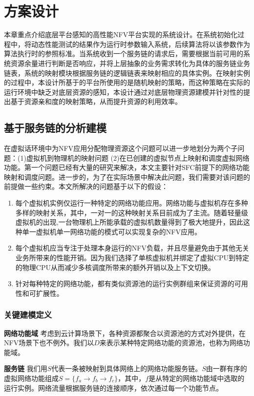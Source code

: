 \chapter{方案设计}
\label{chap:design}
本章重点介绍底层平台感知的高性能NFV平台实现的系统设计。在系统初始化过程中，将动态性能测试的结果作为运行时参数输入系统，后续算法将以该参数作为算法执行时的参照标准。当系统收到一个服务链的请求后，需要根据当前可用的系统资源余量进行判断是否响应，并将上层抽象的业务需求转化为具体的服务链业务链表，系统的映射模块根据服务链的逻辑链表来映射相应的具体实例。在映射实例的过程中，本设计所基于的平台所使用的是随机映射的策略，而这种策略在实际的运行环境中缺乏对底层资源的感知，本设计通过对底层物理资源建模并针对性的提出基于资源亲和度的映射策略，从而提升资源的利用效率。

\section{基于服务链的分析建模}
在虚拟话环境中为NFV应用分配物理资源这个问题可以进一步地划分为两个子问题：(1)虚拟机到物理机的映射问题 (2)在已创建的虚拟节点上映射和调度虚拟网络功能。第一个问题已经有大量的研究来解决，本文主要针对SFC前提下的网络功能映射和调度问题。进一步的，为了在实际场景中解决此问题，我们需要对该问题的前提做一些约束。本文所解决的问题基于以下的假设：
\begin{enumerate}
	\item 每个虚拟机实例仅运行一种特定的网络功能应用。网络功能与虚拟机存在多种多样的映射关系，其中，一对一的这种映射关系目前成为了主流。随着轻量级虚拟机的出现\cite{martins2014clickos,manco2017my},一台物理机上所能承载的虚拟机数量得到了极大地提升，因此这种单一虚拟机单一网络功能的模式可以实现复杂的NFV应用。
	\item 每个虚拟机应当专注于处理本身运行的NFV负载，并且尽量避免由于其他无关业务所带来的性能开销。因为我们选择了单核虚拟机并绑定了虚拟CPU到特定的物理CPU从而减少多核调度所带来的额外开销以及上下文切换。
	\item 针对每种特定的网络功能，都有类似资源池的运行实例群组来保证资源的可用性和可扩展性。
\end{enumerate}

\subsection{关键建模定义}
\textbf{网络功能域}{ }考虑到云计算场景下，各种资源都聚合以资源池的方式对外提供，在NFV场景下也不例外。我们以$D$来表示某种特定网络功能的资源池，也称为网络功能域。

\textbf{服务链}{ }我们用$S$代表一条被映射到具体网络上的网络功能服务链。$S$由一群有序的虚拟网络功能组成$S = \{f_{a} \to f_{b} \to f_{c}\}$，其中，$f$是从特定的网络功能域中选取的运行实例。网络流量根据服务链的连接顺序，依次通过每一个功能节点。

